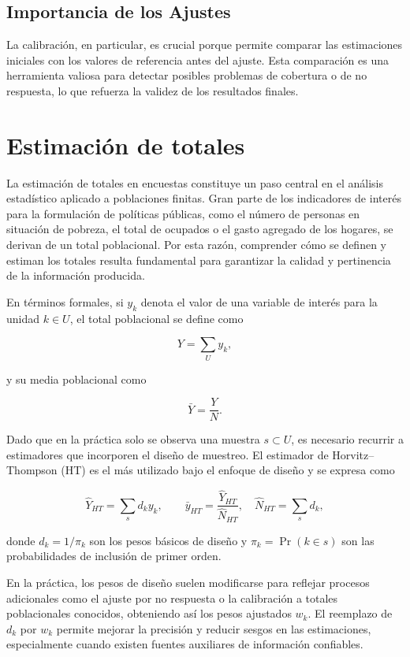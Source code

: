 \documentclass[
  spanish,
  12pt,
]{book}
\begin{document}
\subsection{Importancia de los Ajustes}\label{importancia-de-los-ajustes}

La calibración, en particular, es crucial porque permite comparar las estimaciones iniciales con los valores de referencia antes del ajuste. Esta comparación es una herramienta valiosa para detectar posibles problemas de cobertura o de no respuesta, lo que refuerza la validez de los resultados finales.

\section{Estimación de totales}\label{estimaciuxf3n-de-totales}

La estimación de totales en encuestas constituye un paso central en el análisis estadístico aplicado a poblaciones finitas. Gran parte de los indicadores de interés para la formulación de políticas públicas, como el número de personas en situación de pobreza, el total de ocupados o el gasto agregado de los hogares, se derivan de un total poblacional. Por esta razón, comprender cómo se definen y estiman los totales resulta fundamental para garantizar la calidad y pertinencia de la información producida.

En términos formales, si \(y_k\) denota el valor de una variable de interés para la unidad \(k \in U\), el total poblacional se define como

\[
Y = \sum_{U} y_k,
\]

y su media poblacional como

\[
\bar{Y} = \frac{Y}{N}.
\]

Dado que en la práctica solo se observa una muestra \(s \subset U\), es necesario recurrir a estimadores que incorporen el diseño de muestreo. El estimador de Horvitz--Thompson (HT) es el más utilizado bajo el enfoque de diseño y se expresa como

\[
\hat{Y}_{HT} = \sum_{s} d_k y_k, \qquad \bar{y}_{HT} = \frac{\hat{Y}_{HT}}{\hat{N}_{HT}}, \quad \hat{N}_{HT} = \sum_{s} d_k,
\]

donde \(d_k = 1/\pi_k\) son los pesos básicos de diseño y \(\pi_k = \Pr(k \in s)\) son las probabilidades de inclusión de primer orden.

En la práctica, los pesos de diseño suelen modificarse para reflejar procesos adicionales como el ajuste por no respuesta o la calibración a totales poblacionales conocidos, obteniendo así los pesos ajustados \(w_k\). El reemplazo de \(d_k\) por \(w_k\) permite mejorar la precisión y reducir sesgos en las estimaciones, especialmente cuando existen fuentes auxiliares de información confiables.
\end{document}
